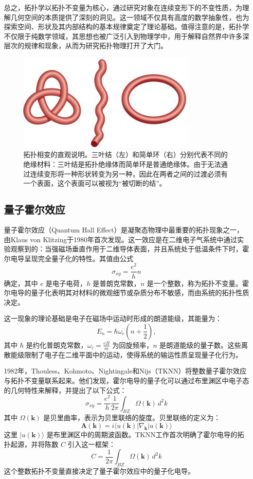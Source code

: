 总之，拓扑学以拓扑不变量为核心，通过研究对象在连续变形下的不变性质，为理解几何空间的本质提供了深刻的洞见。这一领域不仅具有高度的数学抽象性，也为探索空间、形状及其内部结构的基本规律奠定了理论基础。值得注意的是，拓扑学不仅限于纯数学领域，其思想也被广泛引入到物理学中，用于解释自然界中许多深层次的规律和现象，从而为研究拓扑物理打开了大门。
\begin{figure}[h!]
    \centering
    \includegraphics[width=0.8\textwidth]{images/fig1-1.png} 
    \caption{拓扑相变的直观说明。三叶结（左）和简单环（右）分别代表不同的绝缘材料：三叶结是拓扑绝缘体而简单环是普通绝缘体。由于无法通过连续变形将一种形状转变为另一种，因此在两者之间的过渡必须有一个表面，这个表面可以被视为“被切断的结”。\cite{d1}}
    \label{fig_1_1}
\end{figure}


\subsection{量子霍尔效应}
量子霍尔效应（Quantum Hall Effect）是凝聚态物理中最重要的拓扑现象之一，由Klaus von Klitzing于1980年首次发现\cite{d2}。这一效应是在二维电子气系统中通过实验观察到的：当强磁场垂直作用于二维导体表面，并且系统处于低温条件下时，霍尔电导呈现完全量子化的特性。其值由公式
\[
\sigma_{xy} = \frac{e^2}{h} n
\]
确定，其中 \( e \) 是电子电荷，\( h \) 是普朗克常数，\( n \) 是一个整数，称为拓扑不变量。霍尔电导的量子化表明其对材料的微观细节或杂质分布不敏感，而由系统的拓扑性质决定。

这一现象的理论基础是电子在磁场中运动时形成的朗道能级，其能量为：
\[
E_n = \hbar \omega_c \left( n + \frac{1}{2} \right),
\]
其中 \( \hbar \) 是约化普朗克常数，\( \omega_c = \frac{eB}{m} \) 为回旋频率，\( n \) 是朗道能级的量子数。这些离散能级限制了电子在二维平面中的运动，使得系统的输运性质呈现量子化行为。

1982年，Thouless、Kohmoto、Nightingale和Nijs（TKNN）将整数量子霍尔效应与拓扑不变量联系起来\cite{d3}。他们发现，霍尔电导的量子化可以通过布里渊区中电子态的几何特性来解释，并提出了以下公式：
\[
\sigma_{xy} = \frac{e^2}{h} \frac{1}{2\pi} \int_{BZ} \Omega(\mathbf{k}) \, d^2k
\]
其中 \( \Omega(\mathbf{k}) \) 是贝里曲率，表示为贝里联络的旋度。贝里联络的定义为：
\[
\mathbf{A}(\mathbf{k}) = i \langle u(\mathbf{k}) | \nabla_{\mathbf{k}} | u(\mathbf{k}) \rangle
\]
这里 \( |u(\mathbf{k})\rangle \) 是布里渊区中的周期波函数。TKNN工作首次明确了霍尔电导的拓扑起源，并将陈数 \( C \) 引入这一框架：
\[
C = \frac{1}{2\pi} \int_{BZ} \Omega(\mathbf{k}) \, d^2k
\]
这个整数拓扑不变量直接决定了量子霍尔效应中的量子化电导。

